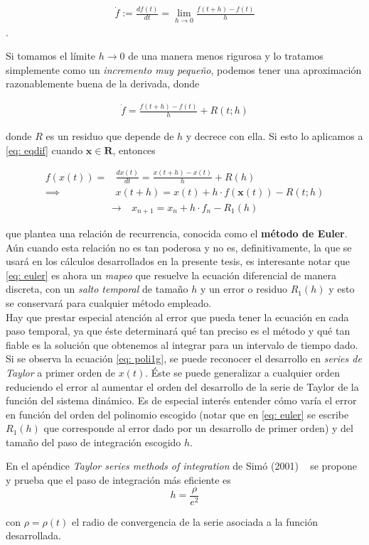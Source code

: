 \begin{align}
 \dot{f} := \frac{df(t)}{dt} = \lim_{h\to 0} \frac{ f(t+h) - f(t) }{h}
 \label{eq: deriv}
\end{align}.

Si tomamos el límite $h \to 0$ de una manera menos rigurosa y lo tratamos simplemente como un \textit{incremento muy pequeño}, podemos tener una aproximación razonablemente buena de la derivada, donde

\begin{align*}
\dot{f} = \frac{ f(t+h) - f(t) }{h} + R(t;h)
\end{align*}

donde $R$ es un residuo que depende de $h$ y decrece con ella. Si esto lo aplicamos a \ref{eq: eqdif} cuando $\textbf{x} \in \mathbf{R}$, entonces

\begin{align}
 f(x(t)) =& \frac{dx(t)}{dt} = \frac{ x(t+h) - x(t) }{h}+ R(h)\\
 \implies& x(t+h) = x(t) + h\cdot f(\textbf{x}(t)) - R(t;h)
 \label{eq: poli1g}
\end{align}
\begin{align}
 \to \ & x_{n+1} = x_n + h\cdot f_n - R_1(h)
 \label{eq: euler}
\end{align}

que plantea una relación de recurrencia, conocida como el \textbf{método de Euler}. Aún cuando esta relación no es tan poderosa y no es, definitivamente, la que se usará en los cálculos desarrollados en la presente tesis, es interesante notar que \ref{eq: euler} es ahora un \textit{mapeo} que resuelve la ecuación diferencial de manera discreta, con un \textit{salto temporal} de tamaño $h$ y un error o residuo $R_1(h)$ y esto se conservará para cualquier método empleado.\\

Hay que prestar especial atención al error que pueda tener la ecuación en cada paso temporal, ya que éste determinará qué tan preciso es el método y qué tan fiable es la solución que obtenemos al integrar para un intervalo de tiempo dado. Si se observa la ecuación \ref{eq: poli1g}, se puede reconocer el desarrollo en \textit{series de Taylor} a primer orden de $x(t)$. Éste se puede generalizar a cualquier orden reduciendo el error al aumentar el orden del desarrollo de la serie de Taylor de la función del sistema dinámico. Es de especial interés entender cómo varía el error en función del orden del polinomio escogido (notar que en \ref{eq: euler} se escribe $R_1(h)$ que corresponde al error dado por un desarrollo de primer orden) y del tamaño del paso de integración escogido $h$.

En el apéndice \textit{Taylor series methods of integration} de Simó (2001) ~\cite{Simo2001} se propone y prueba que el paso de integración más eficiente es 
\begin{equation}
 h = \frac{\rho}{e^{2}}
\end{equation}

con $\rho = \rho(t)$ el radio de convergencia de la serie asociada a la función desarrollada. 